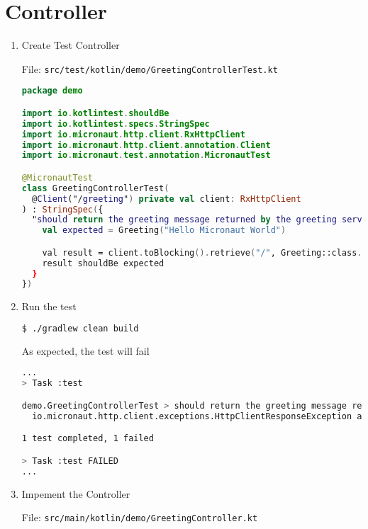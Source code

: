 \documentclass[12pt, letterpaper]{article}
\begin{document}
\section{Controller}\label{sec:controller}

\begin{enumerate}

	\item  Create Test Controller

	      File: \texttt{src/test/kotlin/demo/GreetingControllerTest.kt}

	      \begin{lstlisting}[language=Kotlin]
package demo

import io.kotlintest.shouldBe
import io.kotlintest.specs.StringSpec
import io.micronaut.http.client.RxHttpClient
import io.micronaut.http.client.annotation.Client
import io.micronaut.test.annotation.MicronautTest

@MicronautTest
class GreetingControllerTest(
  @Client("/greeting") private val client: RxHttpClient
) : StringSpec({
  "should return the greeting message returned by the greeting service" {
    val expected = Greeting("Hello Micronaut World")

    val result = client.toBlocking().retrieve("/", Greeting::class.java)
    result shouldBe expected
  }
})
	      \end{lstlisting}

	\item Run the test

	      \begin{lstlisting}[language=bash]
$ ./gradlew clean build
	      \end{lstlisting}

	      As expected, the test will fail

	      \begin{lstlisting}[language=bash]
...
> Task :test

demo.GreetingControllerTest > should return the greeting message returned by the greeting service FAILED
  io.micronaut.http.client.exceptions.HttpClientResponseException at DefaultHttpClient.java:2030

1 test completed, 1 failed

> Task :test FAILED
...
	      \end{lstlisting}

	\item Impement the Controller

	      File: \texttt{src/main/kotlin/demo/GreetingController.kt}


\end{enumerate}
\end{document}
